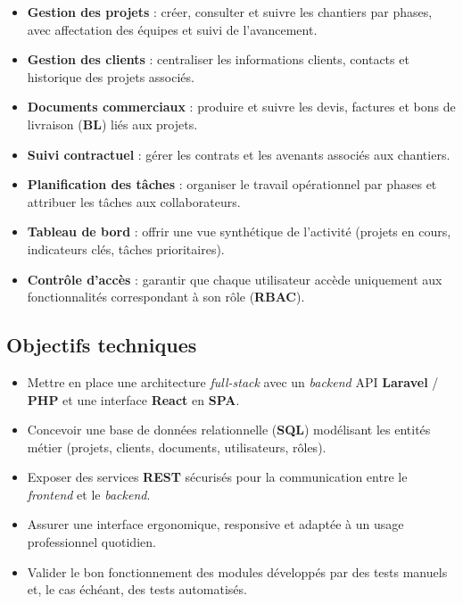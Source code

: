 \begin{itemize}
  \item \textbf{Gestion des projets} : créer, consulter et suivre les chantiers par phases,
  avec affectation des équipes et suivi de l'avancement.
  \item \textbf{Gestion des clients} : centraliser les informations clients, contacts et
  historique des projets associés.
  \item \textbf{Documents commerciaux} : produire et suivre les devis, factures et bons de
  livraison (\textbf{BL}) liés aux projets.
  \item \textbf{Suivi contractuel} : gérer les contrats et les avenants associés aux
  chantiers.
  \item \textbf{Planification des tâches} : organiser le travail opérationnel par phases
  et attribuer les tâches aux collaborateurs.
  \item \textbf{Tableau de bord} : offrir une vue synthétique de l'activité (projets en
  cours, indicateurs clés, tâches prioritaires).
  \item \textbf{Contrôle d'accès} : garantir que chaque utilisateur accède uniquement aux
  fonctionnalités correspondant à son rôle (\textbf{RBAC}).
\end{itemize}

\subsection{Objectifs techniques}

\begin{itemize}
  \item Mettre en place une architecture \textit{full-stack} avec un \textit{backend} API
  \textbf{Laravel} / \textbf{PHP} et une interface \textbf{React} en \textbf{SPA}.
  \item Concevoir une base de données relationnelle (\textbf{SQL}) modélisant les entités
  métier (projets, clients, documents, utilisateurs, rôles).
  \item Exposer des services \textbf{REST} sécurisés pour la communication entre le
  \textit{frontend} et le \textit{backend}.
  \item Assurer une interface ergonomique, responsive et adaptée à un usage professionnel
  quotidien.
  \item Valider le bon fonctionnement des modules développés par des tests manuels et,
  le cas échéant, des tests automatisés.
\end{itemize}


